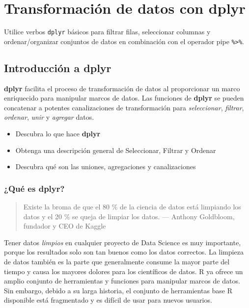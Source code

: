 \documentclass[
]{book}
\providecommand{\tightlist}{%
  \setlength{\itemsep}{0pt}\setlength{\parskip}{0pt}}
\begin{document}
\hypertarget{transformaciuxf3n-de-datos-con-dplyr}{%
\chapter{Transformación de datos con dplyr}\label{transformaciuxf3n-de-datos-con-dplyr}}

Utilice verbos \texttt{dplyr} básicos para filtrar filas, seleccionar columnas y ordenar/organizar conjuntos de datos en combinación con el operador pipe \texttt{\%\textgreater{}\%}.

\hypertarget{introducciuxf3n-a-dplyr}{%
\section{Introducción a dplyr}\label{introducciuxf3n-a-dplyr}}

\textbf{dplyr} facilita el proceso de transformación de datos al proporcionar un marco enriquecido para manipular marcos de datos. Las funciones de \textbf{dplyr} se pueden concatenar a potentes canalizaciones de transformación para \emph{seleccionar}, \emph{filtrar}, \emph{ordenar}, \emph{unir} y \emph{agregar} datos.

\begin{itemize}
\tightlist
\item
  Descubra lo que hace \textbf{dplyr}
\item
  Obtenga una descripción general de Seleccionar, Filtrar y Ordenar
\item
  Descubra qué son las uniones, agregaciones y canalizaciones
\end{itemize}

\hypertarget{quuxe9-es-dplyr}{%
\subsection{¿Qué es dplyr?}\label{quuxe9-es-dplyr}}

\begin{quote}
Existe la broma de que el 80 \% de la ciencia de datos está limpiando los datos y el 20 \% se queja de limpiar los datos.
--- Anthony Goldbloom, fundador y CEO de Kaggle
\end{quote}

Tener datos \emph{limpios} en cualquier proyecto de Data Science es muy importante, porque los resultados solo son tan buenos como los datos correctos. La limpieza de datos también es la parte que generalmente consume la mayor parte del tiempo y causa los mayores dolores para los científicos de datos. R ya ofrece un amplio conjunto de herramientas y funciones para manipular marcos de datos. Sin embargo, debido a su larga historia, el conjunto de herramientas base R disponible está fragmentado y es difícil de usar para nuevos usuarios.
\end{document}
